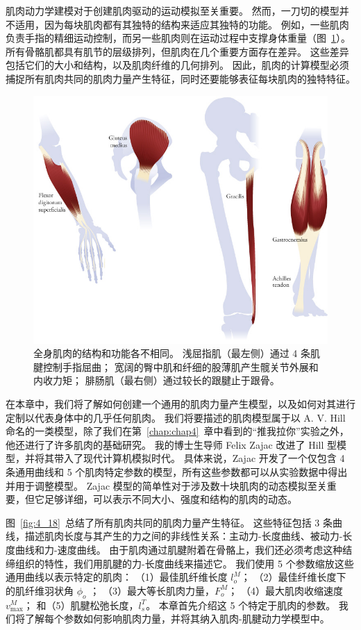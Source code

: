 肌肉动力学建模对于创建肌肉驱动的运动模拟至关重要。
然而，一刀切的模型并不适用，因为每块肌肉都有其独特的结构来适应其独特的功能。
例如，一些肌肉负责手指的精细运动控制，而另一些肌肉则在运动过程中支撑身体重量（图~\ref{fig:5_1}）。
所有骨骼肌都具有肌节的层级排列，但肌肉在几个重要方面存在差异。
这些差异包括它们的大小和结构，以及肌肉纤维的几何排列。
因此，肌肉的计算模型必须捕捉所有肌肉共同的肌肉力量产生特征，同时还要能够表征每块肌肉的独特特征。


\begin{figure}[!htb]
	\centering
	\includegraphics[width=1.0\linewidth]{chap5/5_1}
	\caption{全身肌肉的结构和功能各不相同。
		浅屈指肌（最左侧）通过 4 条肌腱控制手指屈曲；
		宽阔的臀中肌和纤细的股薄肌产生髋关节外展和内收力矩；
		腓肠肌（最右侧）通过较长的跟腱止于跟骨。 \label{fig:5_1}}
\end{figure}


在本章中，我们将了解如何创建一个通用的肌肉力量产生模型，以及如何对其进行定制以代表身体中的几乎任何肌肉。
我们将要描述的肌肉模型属于以 A. V. Hill 命名的一类模型，除了我们在第~\ref{chap:chap4}~章中看到的“推我拉你”实验之外，他还进行了许多肌肉的基础研究。
我的博士生导师 Felix Zajac 改进了 Hill 型模型，并将其带入了现代计算机模拟时代\cite{zajac1989muscle}。
具体来说，Zajac 开发了一个仅包含 4 条通用曲线和 5 个肌肉特定参数的模型，所有这些参数都可以从实验数据中得出并用于调整模型。
Zajac 模型的简单性对于涉及数十块肌肉的动态模拟至关重要，但它足够详细，可以表示不同大小、强度和结构的肌肉的动态。


图~\ref{fig:4_18}~总结了所有肌肉共同的肌肉力量产生特征。
这些特征包括 3 条曲线，描述肌肉长度与其产生的力之间的非线性关系：主动力-长度曲线、被动力-长度曲线和力-速度曲线。
由于肌肉通过肌腱附着在骨骼上，我们还必须考虑这种结缔组织的特性，我们用肌腱的力-长度曲线来描述它。
我们使用 5 个参数缩放这些通用曲线以表示特定的肌肉：
（1）最佳肌纤维长度 $l_o^M$；
（2）最佳纤维长度下的肌纤维羽状角 $\phi_o$ ；
（3）最大等长肌肉力量，$F_o^M$；
（4）最大肌肉收缩速度 $v_\text{max}^M$；
和（5）肌腱松弛长度，$l_s^T$。
本章首先介绍这 5 个特定于肌肉的参数。
我们将了解每个参数如何影响肌肉力量，并将其纳入肌肉-肌腱动力学模型中。



